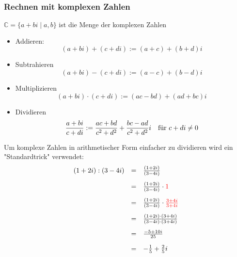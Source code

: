 \documentclass{article}
\newcommand{\mesp}{\phantom{\hspace{10px}}}
\newcommand{\C}{\mathbb{C}}
\begin{document}
\newpage
\subsubsection{Rechnen mit komplexen Zahlen}

$\C = \{a + bi \mid a, b\}$ ist die Menge der komplexen Zahlen

\begin{itemize}
    \item Addieren:
        \begin{equation*}
            (a + bi) + (c + di) := (a + c) + (b + d)i
        \end{equation*}
    \item Subtrahieren
        \begin{equation*}
            (a + bi) - (c + di) := (a - c) + (b - d)i
        \end{equation*}
    \item Multiplizieren
        \begin{equation*}
            (a + bi) \cdot (c + di) := (ac - bd) + (ad + bc)i
        \end{equation*}
    \item Dividieren
        \begin{equation*}
            \frac{a + bi}{c + di} := \frac{ac + bd}{c^2 + d^2} + \frac{bc - ad}{c^2 + d^2}i \mesp \text{für } c + di \neq 0
        \end{equation*}
\end{itemize}

Um komplexe Zahlen in arithmetischer Form einfacher zu dividieren wird ein "Standardtrick" verwendet:
\begin{equation*}
    \begin{array}{lcl}
        (1 + 2i) : (3 - 4i) & = & \frac{(1 + 2i)}{(3 - 4i)} \\[10pt]
                            & = & \frac{(1 + 2i)}{(3 - 4i)} \cdot {\color{red} 1} \\[10pt]
                            & = & \frac{(1 + 2i)}{(3 - 4i)} \cdot {\color{red} \frac{3 + 4i}{3 + 4i}} \\[10pt]
                            & = & \frac{(1 + 2i) \cdot (3 + 4i)}{(3 - 4i) \cdot (3 + 4i)} \\[10pt]
                            & = & \frac{-5 + 10i}{25} \\[10pt]
                            & = & -\frac{1}{5} + \frac{2}{5}i
    \end{array}
\end{equation*}
\end{document}
